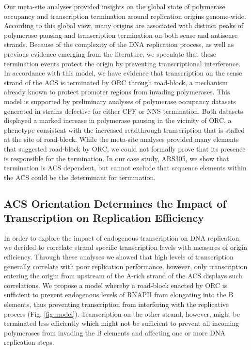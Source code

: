 Our meta-site analyses provided insights on the global state of polymerase occupancy and transcription termination around replication origins genome-wide. According to this global view, many origins are associated with distinct peaks of polymerase pausing and transcription termination on both sense and antisense strands. Because of the complexity of the DNA replication process, as well as previous evidence emerging from the literature, we speculate that these termination events protect the origin by preventing transcriptional interference. In accordance with this model, we have evidence that transcription on the sense strand of the ACS is terminated by ORC through road-block, a mechanism already known to protect promoter regions from invading polymerases. This model is supported by preliminary analyses of polymerase occupancy datasets generated in strains defective for either CPF or NNS termination. Both datasets displayed a marked increase in polymerase pausing in the vicinity of ORC, a phenotype consistent with the increased readthrough transcription that is stalled at the site of road-block. While the meta-site analyses provided many elements that suggested road-block by ORC, we could not formally prove that its presence is responsible for the termination. In our case study, ARS305, we show that termination is ACS dependent, but cannot exclude that sequence elements within the ACS could be the determinant for termination. 

\singlespacing
\subsection{ACS Orientation Determines the Impact of Transcription on Replication Efficiency}
\doublespacing

In order to explore the impact of endogenous transcription on DNA replication, we decided to correlate strand specific transcription levels with measures of origin efficiency. Through these analyses we showed that high levels of transcription generally correlate with poor replication performance, however, only transcription entering the origin from upstream of the A-rich strand of the ACS displays such correlations. We propose a model whereby a road-block enacted by ORC is sufficient to prevent endogenous levels of RNAPII from elongating into the B elements, thus preventing transcription from interfering with the replicative process (Fig. \ref{fig:model}). Transcription on the other strand, however, might be terminated less efficiently which might not be sufficient to prevent all incoming polymerases from invading the B elements and affecting one or more DNA replication steps. 

